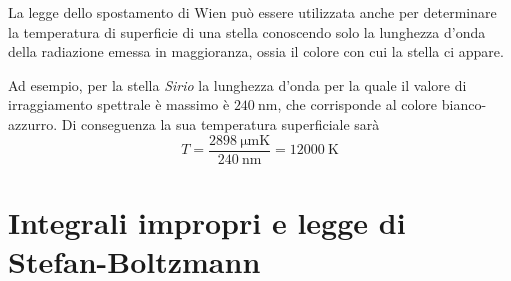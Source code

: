 \documentclass[12pt,twoside]{report}
\begin{document}
\par{La legge dello spostamento di Wien può essere utilizzata anche per determinare la temperatura di superficie di una stella conoscendo solo la lunghezza d'onda della radiazione emessa in maggioranza, ossia il colore con cui la stella ci appare.}
\par{Ad esempio, per la stella \textit{Sirio} la lunghezza d'onda per la quale il valore di irraggiamento spettrale è massimo è $\SI{240}{\nano\meter}$, che corrisponde al colore bianco-azzurro. Di conseguenza la sua temperatura superficiale sarà
$$ T = \frac{\SI{2898}{\micro\meter \kelvin}}{\SI{240}{\nano\meter}} = \SI{12000}{\kelvin} $$}



\section{Integrali impropri e legge di Stefan-Boltzmann}
\end{document}
